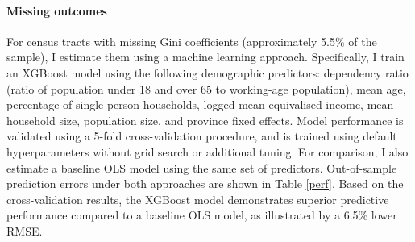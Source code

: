 \paragraph{Missing outcomes} For census tracts with missing Gini coefficients (approximately 5.5\% of the sample), I estimate them using a machine learning approach. Specifically, I train an XGBoost model using the following demographic predictors: dependency ratio (ratio of population under 18 and over 65 to working-age population), mean age, percentage of single-person households, logged mean equivalised income, mean household size, population size, and province fixed effects. Model performance is validated using a 5-fold cross-validation procedure, and is trained using default hyperparameters without grid search or additional tuning. For comparison, I also estimate a baseline OLS model using the same set of predictors. Out-of-sample prediction errors under both approaches are shown in Table \ref{perf}. Based on the cross-validation results, the XGBoost model demonstrates superior predictive performance compared to a baseline OLS model, as illustrated by a 6.5\% lower RMSE.

\begin{table}[H]
\centering
{}
\end{table}

